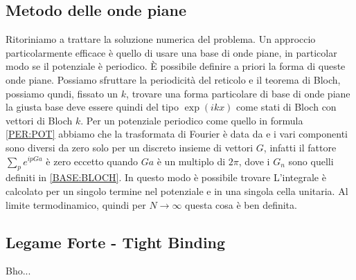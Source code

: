 \documentclass[a4paper,12pt]{article}
\begin{document}
\subsection{Metodo delle onde piane}
Ritoriniamo a trattare la soluzione numerica del problema. Un approccio particolarmente efficace è quello di usare una base di onde piane, in particolar modo se il potenziale è periodico. \`E possibile definire a priori la forma di queste onde piane. Possiamo sfruttare la periodicità del reticolo e il teorema di Bloch, possiamo qundi, fissato un $k$, trovare una forma particolare di base di onde piane
la giusta base deve essere quindi del tipo $\exp(ikx)$ come stati di Bloch con vettori di Bloch $k$. Per un potenziale periodico come quello in formula \ref{PER:POT} abbiamo che la trasformata di Fourier è data da
e i vari componenti sono diversi da zero solo per un discreto insieme di vettori $G$, infatti il fattore $\sum_pe^{ipGa}$ è zero eccetto quando $Ga$ è un multiplo di $2\pi$, dove i $G_n$ sono quelli definiti in \ref{BASE:BLOCH}. In questo modo è possibile trovare
L'integrale è calcolato per un singolo termine nel potenziale e in una singola cella unitaria. Al limite termodinamico, quindi per $N\to\infty$ questa cosa è ben definita.

\subsection{Legame Forte - Tight Binding}
Bho...
\end{document}
